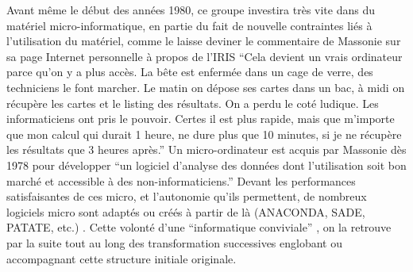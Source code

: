 Avant même le début des années 1980, ce groupe investira très vite dans du matériel micro-informatique, en partie du fait de nouvelle contraintes liés à l'utilisation du matériel, comme le laisse deviner le commentaire de Massonie sur sa page Internet personnelle à propos de l'IRIS \enquote{Cela devient un vrais ordinateur parce qu'on y a plus accès. La bête est enfermée dans un cage de verre, des techniciens le font marcher. Le matin on dépose ses cartes dans un bac, à midi on récupère les cartes et le listing des résultats. On a perdu le coté ludique. Les informaticiens ont pris le pouvoir. Certes il est plus rapide, mais que m'importe que mon calcul qui durait 1 heure, ne dure plus que 10 minutes, si je ne récupère les résultats que 3 heures après.} Un micro-ordinateur est acquis par Massonie dès 1978 pour développer \enquote{un logiciel d'analyse des données dont l'utilisation soit bon marché et accessible à des non-informaticiens.} Devant les performances satisfaisantes de ces micro, et l'autonomie qu'ils permettent, de nombreux logiciels micro sont adaptés ou créés à partir de là (ANACONDA, SADE, PATATE, etc.) \autocite{Massonie1986}. Cette volonté d'une \enquote{informatique conviviale} \autocite{TSH1984}, on la retrouve par la suite tout au long des transformation successives englobant ou accompagnant cette structure initiale originale.

